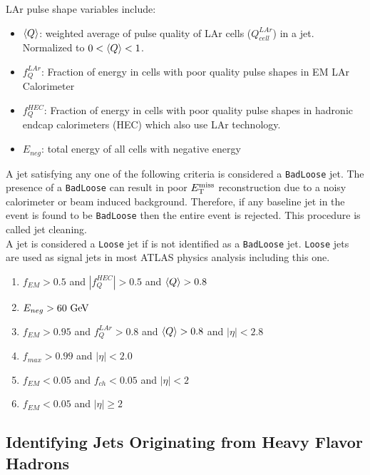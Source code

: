 \indent LAr pulse shape variables include: \\

\begin{itemize}
\item[] $\braket{Q}$: weighted average of pulse quality of LAr cells ($Q^{LAr}_{cell}$) in a jet.  Normalized to $0 < \braket{Q} < 1$.
\item[] $f^{LAr}_{Q}$: Fraction of energy in cells with poor quality pulse shapes in EM LAr Calorimeter
\item[] $f^{HEC}_{Q}$: Fraction of energy in cells with poor quality pulse shapes in hadronic endcap calorimeters (HEC) which also use LAr technology.
\item[] $E_{neg}$: total energy of all cells with negative energy
\end{itemize}

\indent A jet satisfying any one of the following criteria is considered a {\tt BadLoose} jet.  The presence of a {\tt BadLoose} can result in poor $E_{\mathrm{T}}^{\mathrm{miss}}$ reconstruction due to a noisy calorimeter or beam induced background.  Therefore, if any baseline jet in the event is found to be {\tt BadLoose} then the entire event is rejected.   This procedure is called jet cleaning.  \\

\indent A jet is considered a {\tt Loose} jet if is not identified as a {\tt BadLoose} jet.  {\tt Loose} jets are used as signal jets in most ATLAS physics analysis including this one. \\

\begin{enumerate}
\item[] $f_{EM} > 0.5$ and $|f^{HEC}_{Q}| > 0.5$ and $\braket{Q} > 0.8$
\item[] $E_{neg} > 60 \gev$
\item[] $f_{EM} > 0.95$ and $f^{LAr}_{Q} > 0.8$ and $\braket{Q}>0.8$ and $|\eta|<2.8$
\item[] $f_{max}>0.99$ and $|\eta|<2.0$
\item[] $f_{EM}<0.05$ and $f_{ch}<0.05$ and $|\eta|<2$
\item[] $f_{EM}<0.05$ and $|\eta|\ge2$
\end{enumerate}

\subsection{Identifying Jets Originating from Heavy Flavor Hadrons}
\label{sec:jet:btagging}

